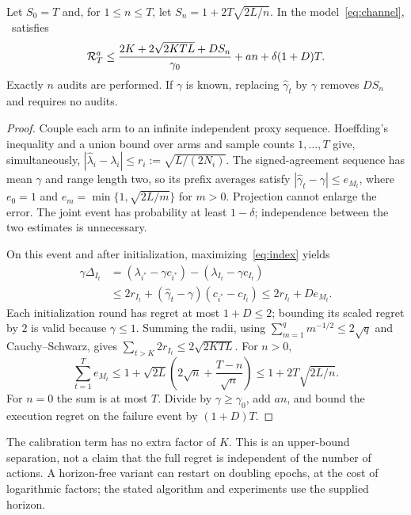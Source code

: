 \begin{theorem}\label{thm:upper}
Let $S_0=T$ and, for $1\leq n\leq T$, let
$S_n=1+2T\sqrt{2L/n}$. In the model~\eqref{eq:channel}, \SC\ satisfies
\begin{equation}
\mathcal{R}_T^a\leq
\frac{2K+2\sqrt{2KTL}+DS_n}{\gamma_0}
+an+\delta(1+D)T.
\label{eq:upper}
\end{equation}
Exactly $n$ audits are performed. If $\gamma$ is known, replacing $\widehat\gamma_t$ by $\gamma$ removes $DS_n$ and requires no audits.
\end{theorem}
\begin{proof}
Couple each arm to an infinite independent proxy sequence. Hoeffding's inequality and a union bound over arms and sample counts $1,\ldots,T$ give, simultaneously,
$|\widehat\lambda_i-\lambda_i|\leq r_i:=\sqrt{L/(2N_i)}$.
The signed-agreement sequence has mean $\gamma$ and range length two, so its prefix averages satisfy
$|\widehat\gamma_t-\gamma|\leq e_{M_t}$,
where $e_0=1$ and $e_m=\min\{1,\sqrt{2L/m}\}$ for $m>0$. Projection cannot enlarge the error. The joint event has probability at least $1-\delta$; independence between the two estimates is unnecessary.

On this event and after initialization, maximizing~\eqref{eq:index} yields
\begin{align}
\gamma\Delta_{I_t}
&=(\lambda_{i^*}-\gamma c_{i^*})-(\lambda_{I_t}-\gamma c_{I_t})\nonumber\\
&\leq 2r_{I_t}+(\widehat\gamma_t-\gamma)(c_{i^*}-c_{I_t})
\leq2r_{I_t}+D e_{M_t}.
\label{eq:one-step}
\end{align}
Each initialization round has regret at most $1+D\leq2$; bounding its scaled regret by $2$ is valid because $\gamma\leq1$. Summing the radii, using $\sum_{m=1}^{q}m^{-1/2}\leq2\sqrt q$ and Cauchy--Schwarz, gives $\sum_{t>K}2r_{I_t}\leq2\sqrt{2KTL}$. For $n>0$,
\begin{equation}
\sum_{t=1}^Te_{M_t}
\leq1+\sqrt{2L}\left(2\sqrt n+\frac{T-n}{\sqrt n}\right)
\leq1+2T\sqrt{2L/n}.
\label{eq:sumscale}
\end{equation}
For $n=0$ the sum is at most $T$. Divide by $\gamma\geq\gamma_0$, add $an$, and bound the execution regret on the failure event by $(1+D)T$.
\end{proof}
The calibration term has no extra factor of $K$. This is an upper-bound separation, not a claim that the full regret is independent of the number of actions. A horizon-free variant can restart on doubling epochs, at the cost of logarithmic factors; the stated algorithm and experiments use the supplied horizon.

